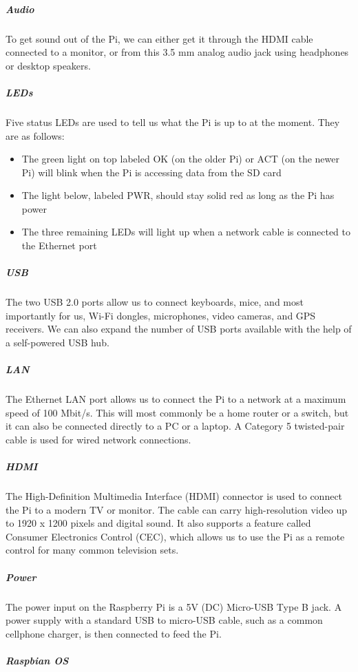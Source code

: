 \subparagraph*{Audio}
\hfill \break
To get sound out of the Pi, we can either get it through the HDMI cable connected
to a monitor, or from this 3.5 mm analog audio jack using headphones or
desktop speakers.

\subparagraph*{LEDs}
\hfill \break
Five status LEDs are used to tell us what the Pi is up to at the moment. They are
as follows:
\begin{itemize}
  \item The green light on top labeled OK (on the older Pi) or ACT (on the newer Pi)
will blink when the Pi is accessing data from the SD card
  \item The light below, labeled PWR, should stay solid red as long as the Pi
has power
  \item The three remaining LEDs will light up when a network cable is connected
to the Ethernet port
\end{itemize}

\subparagraph*{USB}
\hfill \break
The two USB 2.0 ports allow us to connect keyboards, mice, and most importantly
for us, Wi-Fi dongles, microphones, video cameras, and GPS receivers. We can also
expand the number of USB ports available with the help of a self-powered USB hub.

\subparagraph*{LAN}
\hfill \break
The Ethernet LAN port allows us to connect the Pi to a network at a maximum speed
of 100 Mbit/s. This will most commonly be a home router or a switch, but it can also
be connected directly to a PC or a laptop. A Category 5 twisted-pair cable is used for
wired network connections.

\subparagraph*{HDMI}
\hfill \break
The High-Definition Multimedia Interface (HDMI) connector is used to connect the
Pi to a modern TV or monitor. The cable can carry high-resolution video up to 1920 x
1200 pixels and digital sound. It also supports a feature called Consumer Electronics
Control (CEC), which allows us to use the Pi as a remote control for many common
television sets.

\subparagraph*{Power}
\hfill \break
The power input on the Raspberry Pi is a 5V (DC) Micro-USB Type B jack. A power
supply with a standard USB to micro-USB cable, such as a common cellphone
charger, is then connected to feed the Pi.

\subparagraph*{Raspbian OS}

